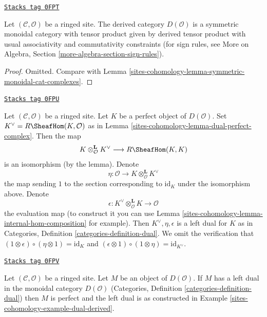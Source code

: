 \begin{lemma}
\label{sites-cohomology-lemma-symmetric-monoidal-derived}
\href{https://stacks.math.columbia.edu/tag/0FPT}{\texttt{Stacks tag 0FPT}}

Let $(\mathcal{C}, \mathcal{O})$ be a ringed site. The derived category
$D(\mathcal{O})$ is a symmetric monoidal category with tensor product
given by derived tensor product with usual associativity and
commutativity constraints (for sign rules, see
More on Algebra, Section \ref{more-algebra-section-sign-rules}).
\end{lemma}

\begin{proof}
Omitted. Compare with Lemma \ref{sites-cohomology-lemma-symmetric-monoidal-cat-complexes}.
\end{proof}

\begin{example}
\label{sites-cohomology-example-dual-derived}
\href{https://stacks.math.columbia.edu/tag/0FPU}{\texttt{Stacks tag 0FPU}}

Let $(\mathcal{C}, \mathcal{O})$ be a ringed site. Let $K$ be a perfect object
of $D(\mathcal{O})$. Set $K^\vee = R\SheafHom(K, \mathcal{O})$
as in Lemma \ref{sites-cohomology-lemma-dual-perfect-complex}.
Then the map
$$
K \otimes_\mathcal{O}^\mathbf{L} K^\vee \longrightarrow R\SheafHom(K, K)
$$
is an isomorphism (by the lemma). Denote
$$
\eta :
\mathcal{O}
\longrightarrow
K \otimes_\mathcal{O}^\mathbf{L} K^\vee
$$
the map sending $1$ to the section corresponding to
$\text{id}_K$ under the isomorphism above.
Denote
$$
\epsilon :
K^\vee
\otimes_\mathcal{O}^\mathbf{L} K
\longrightarrow
\mathcal{O}
$$
the evaluation map (to construct it you can use
Lemma \ref{sites-cohomology-lemma-internal-hom-composition} for example). Then
$K^\vee, \eta, \epsilon$ is a left dual for $K$ as in
Categories, Definition \ref{categories-definition-dual}.
We omit the verification that
$(1 \otimes \epsilon) \circ (\eta \otimes 1) = \text{id}_K$
and
$(\epsilon \otimes 1) \circ (1 \otimes \eta) =
\text{id}_{K^\vee}$.
\end{example}

\begin{lemma}
\label{sites-cohomology-lemma-left-dual-derived}
\href{https://stacks.math.columbia.edu/tag/0FPV}{\texttt{Stacks tag 0FPV}}

Let $(\mathcal{C}, \mathcal{O})$ be a ringed site. Let $M$ be an object
of $D(\mathcal{O})$. If $M$ has a left dual in the monoidal category
$D(\mathcal{O})$ (Categories, Definition \ref{categories-definition-dual})
then $M$ is perfect and the left dual is as constructed in
Example \ref{sites-cohomology-example-dual-derived}.
\end{lemma}

